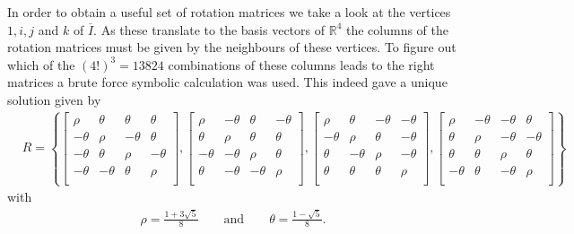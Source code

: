 In order to obtain a useful set of rotation matrices we take a look at the vertices $1,i,j$ and $k$ of $\overline{I}$. As these translate to the basis vectors of $\mathbb{R}^4$ the columns of the rotation matrices must be given by the neighbours of these vertices. To figure out which of the $(4!)^3 = 13824$ combinations of these columns leads to the right matrices a brute force symbolic calculation was used. This indeed gave a unique solution given by
\begin{align*}
  & R = \left\{
 \begin{bmatrix}
  \rho    & \theta  & \theta  & \theta  \\
  -\theta & \rho    & -\theta & \theta  \\
  -\theta & \theta  & \rho    & -\theta \\
  -\theta & -\theta & \theta  & \rho    \\
 \end{bmatrix},
 \begin{bmatrix}
  \rho    & -\theta & \theta  & -\theta \\
  \theta  & \rho    & \theta  & \theta  \\
  -\theta & -\theta & \rho    & \theta  \\
  \theta  & -\theta & -\theta & \rho    \\
 \end{bmatrix},
 \begin{bmatrix}
  \rho    & \theta  & -\theta & -\theta \\
  -\theta & \rho    & \theta  & -\theta \\
  \theta  & -\theta & \rho    & -\theta \\
  \theta  & \theta  & \theta  & \rho    \\
 \end{bmatrix},
 \begin{bmatrix}
  \rho    & -\theta & -\theta & \theta  \\
  \theta  & \rho    & -\theta & -\theta \\
  \theta  & \theta  & \rho    & \theta  \\
  -\theta & \theta  & -\theta & \rho    \\
 \end{bmatrix}
 \right\}
\end{align*}
with
\begin{align*}                                                                   \rho = \frac{1 + 3\sqrt{5}}{8} \qquad \textrm{and} \qquad \theta = \frac{1-\sqrt{5}}{8} \textrm{.}
\end{align*}
